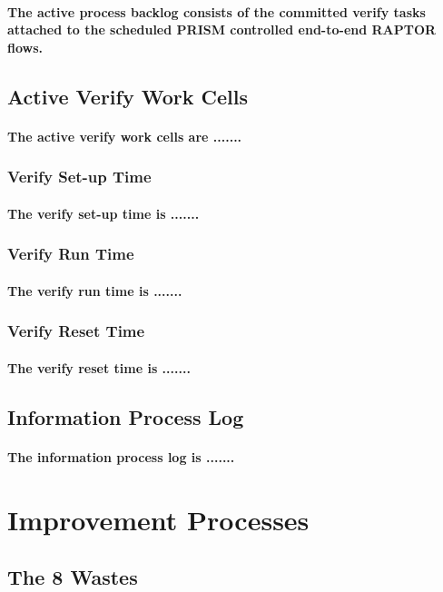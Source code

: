 \documentclass{acm_proc_article-sp}
\begin{document}
\paragraph{The active process backlog consists of the committed verify tasks attached to the scheduled PRISM controlled end-to-end RAPTOR flows.}
\subsection{Active Verify Work Cells}
\paragraph{The active verify work cells are .......}
\subsubsection{Verify Set-up Time}
\paragraph{The verify set-up time is .......}
\subsubsection{Verify Run Time}
\paragraph{The verify run time is .......}
\subsubsection{Verify Reset Time}
\paragraph{The verify reset time is .......}
\subsection{Information Process Log}
\paragraph{The information process log is .......}
\newpage
\section{Improvement Processes}
\subsection{The 8 Wastes}
\end{document}
